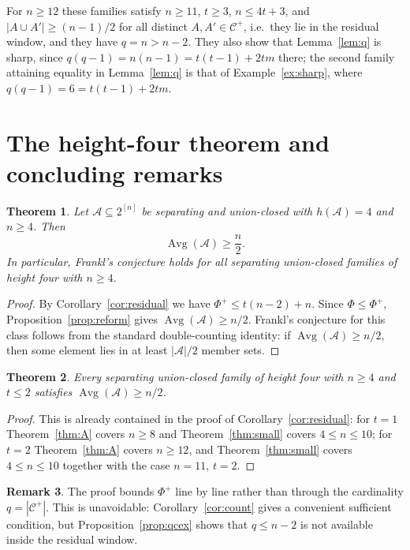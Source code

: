 \documentclass[11pt,a4paper]{amsart}
\theoremstyle{plain}
\newtheorem{theorem}{Theorem}[section]
\theoremstyle{definition}
\newtheorem{remark}[theorem]{Remark}
\newcommand{\A}{\mathcal{A}}
\newcommand{\Cc}{\mathcal{C}}
\newcommand{\Avg}{\operatorname{Avg}}
\newcommand{\Cp}{\Cc^{+}}
\begin{document}
For $n\ge12$ these families satisfy $n\ge11$, $t\ge3$, $n\le4t+3$, and
$|A\cup A'|\ge(n-1)/2$ for all distinct $A,A'\in\Cp$, i.e.\ they lie in the
residual window, and they have $q=n>n-2$. They also show that
Lemma~\ref{lem:q} is sharp, since
$q(q-1)=n(n-1)=t(t-1)+2tm$ there; the second family attaining equality in
Lemma~\ref{lem:q} is that of Example~\ref{ex:sharp}, where
$q(q-1)=6=t(t-1)+2tm$.

\section{The height-four theorem and concluding remarks}\label{sec:main}

\begin{theorem}\label{thm:main}
Let $\A\subseteq2^{[n]}$ be separating and union-closed with $h(\A)=4$ and $n\ge4$. Then
\[
  \Avg(\A)\ge\frac n2.
\]
In particular, Frankl's conjecture holds for all separating union-closed families
of height four with $n\ge4$.
\end{theorem}

\begin{proof}
By Corollary~\ref{cor:residual} we have $\Phi^+\le t(n-2)+n$. Since
$\Phi\le\Phi^+$, Proposition~\ref{prop:reform} gives $\Avg(\A)\ge n/2$.
Frankl's conjecture for this class follows from the standard double-counting
identity: if $\Avg(\A)\ge n/2$, then some element lies in at least $|\A|/2$
member sets.
\end{proof}

\begin{theorem}\label{thm:t2-final}
Every separating union-closed family of height four with $n\ge4$ and $t\le2$ satisfies
$\Avg(\A)\ge n/2$.
\end{theorem}

\begin{proof}
This is already contained in the proof of Corollary~\ref{cor:residual}: for
$t=1$ Theorem~\ref{thm:A} covers $n\ge8$ and Theorem~\ref{thm:small} covers
$4\le n\le10$; for $t=2$ Theorem~\ref{thm:A} covers $n\ge12$, and
Theorem~\ref{thm:small} covers $4\le n\le10$ together with the case $n=11$, $t=2$.
\end{proof}

\begin{remark}
The proof bounds $\Phi^+$ line by line rather than through the cardinality
$q=|\Cp|$. This is unavoidable: Corollary~\ref{cor:count} gives a convenient
sufficient condition, but Proposition~\ref{prop:qcex} shows that $q\le n-2$ is
not available inside the residual window.
\end{remark}
\end{document}
